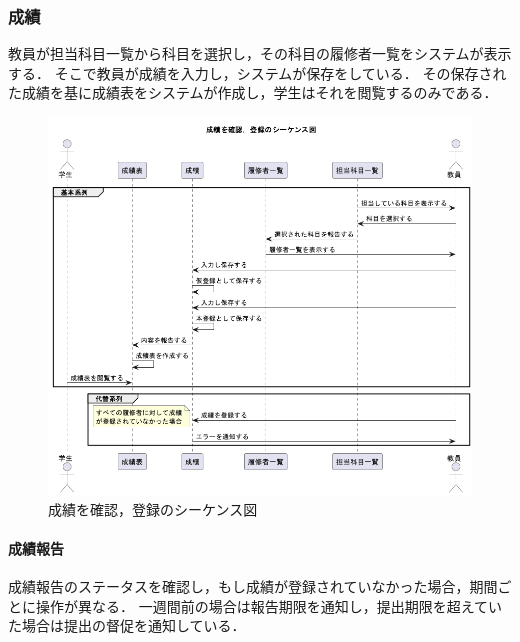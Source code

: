 \documentclass[documentclass]{jsarticle}
\begin{document}
\subsubsection*{成績}
教員が担当科目一覧から科目を選択し，その科目の履修者一覧をシステムが表示する．
そこで教員が成績を入力し，システムが保存をしている．
その保存された成績を基に成績表をシステムが作成し，学生はそれを閲覧するのみである．

\begin{figure}[H]
  \begin{center}
    \includegraphics*[scale=0.5]{figure/6-4.png}
  \end{center}
  \caption{成績を確認，登録のシーケンス図}
  \label{fig:6-4}
\end{figure}

\paragraph*{成績報告}
成績報告のステータスを確認し，もし成績が登録されていなかった場合，期間ごとに操作が異なる．
一週間前の場合は報告期限を通知し，提出期限を超えていた場合は提出の督促を通知している．
\end{document}
